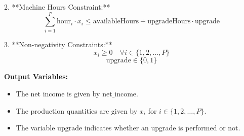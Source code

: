 \documentclass{article}
\begin{document}
2. **Machine Hours Constraint:**
\[
\sum_{i=1}^{P} \text{hour}_i \cdot x_i \leq \text{availableHours} + \text{upgradeHours} \cdot \text{upgrade}
\]

3. **Non-negativity Constraints:**
\[
x_i \geq 0 \quad \forall i \in \{1, 2, \ldots, P\}
\]
\[
\text{upgrade} \in \{0, 1\}
\]

\textbf{Output Variables:}
\begin{itemize}
    \item The net income is given by \( \text{net\_income} \).
    \item The production quantities are given by \( x_i \) for \( i \in \{1, 2, \ldots, P\} \).
    \item The variable \( \text{upgrade} \) indicates whether an upgrade is performed or not.
\end{itemize}
\end{document}
